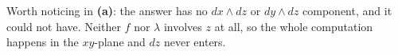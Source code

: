 \begin{exercisesolution}
\begin{remark}
Worth noticing in \textbf{(a)}: the answer has no $dx\wedge dz$ or $dy\wedge dz$ component, and it
could not have. Neither $f$ nor $\lambda$ involves $z$ at all, so the whole computation happens in
the $xy$-plane and $dz$ never enters.
\end{remark}
\end{exercisesolution}
